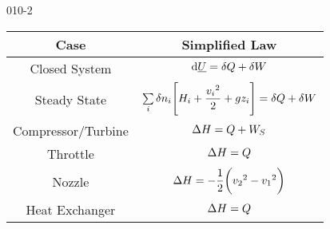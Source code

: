 \begin{mitframe}{010-2}


	\begin{longtable}{|c|c|}
	\hline
	Case & Simplified Law \\ \hline
    Closed System & $\mathrm{d}\uline{\intenergy}=\blthick\heatflow+\blthick\work$ \\ \hline
    Steady State & $\sum\limits_{\state}\blthick n_{\state}\Bigg[\enthalpy_{\state}+\dfrac{{\vvel_{\state}}^{2}}{2}+\grav\heightz_{\state}\Bigg]=\blthick\heatflow+\blthick\work$ \\ \hline
   	Compressor/Turbine & $\iipf\enthalpy=\heatflow+\work_{\entropy}$ \\ \hline 
    Throttle & $\iipf\enthalpy=\heatflow$ \\ \hline
    Nozzle & $\iipf\enthalpy=-\dfrac{1}{2}\bigg({\vvel_{2}}^{2}-{\vvel_{1}}^{2}\bigg)$\\ \hline
    Heat Exchanger & $\iipf\enthalpy=\heatflow$ \\ \hline
    
    \end{longtable}

\end{mitframe}